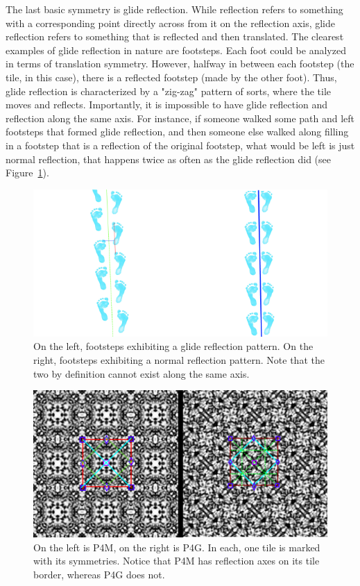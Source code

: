 The last basic symmetry is glide reflection. While reflection refers to something with a corresponding point directly across from it on the reflection axis, glide reflection refers to something that is reflected and then translated. The clearest examples of glide reflection in nature are footsteps. Each foot could be analyzed in terms of translation symmetry. However, halfway in between each footstep (the tile, in this case), there is a reflected footstep (made by the other foot). Thus, glide reflection is characterized by a "zig-zag" pattern of sorts, where the tile moves and reflects. Importantly, it is impossible to have glide reflection and reflection along the same axis. For instance, if someone walked some path and left footsteps that formed glide reflection, and then someone else walked along filling in a footstep that is a reflection of the original footstep, what would be left is just normal reflection, that happens twice as often as the glide reflection did (see Figure~\ref{glide}).

\begin{figure}
\centering
\includegraphics[width=0.9\columnwidth]{glide}
\caption{On the left, footsteps exhibiting a glide reflection pattern. On the right, footsteps exhibiting a normal reflection pattern. Note that the two by definition cannot exist along the same axis.}
\label{glide}
\end{figure}

\begin{figure}[!ht]
\centering
\includegraphics[width=0.9\columnwidth]{ann_images}
\caption{On the left is P4M, on the right is P4G. In each, one tile is marked with its symmetries. Notice that P4M has reflection axes on its tile border, whereas P4G does not.}
\label{fig:P4GvP4M}
\end{figure}

